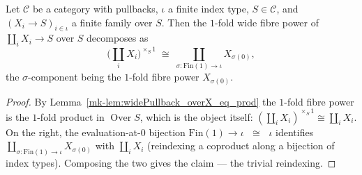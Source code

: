 \begin{lemma}\label{mk-lem:coproduct_distrib_fibrePower_zero}
  \leanok

  Let \(\mathcal{C}\) be a category with pullbacks, \(\iota\) a finite index type, \(S \in
  \mathcal{C}\), and \((X_i \to S)_{i \in \iota}\) a finite family over \(S\). Then the \(1\)-fold
  wide fibre power of \(\coprod_i X_i \to S\) over \(S\) decomposes as
  \[
    \bigl(\textstyle\coprod_{i} X_i\bigr)^{\times_S 1}
      \;\cong\;
    \coprod_{\sigma : \mathrm{Fin}(1) \to \iota} X_{\sigma(0)},
  \]
  the \(\sigma\)-component being the \(1\)-fold fibre power \(X_{\sigma(0)}\).
\end{lemma}
\begin{proof}
  By Lemma~\ref{mk-lem:widePullback_overX_eq_prod} the \(1\)-fold fibre power is the \(1\)-fold product
  in \(\operatorname{Over} S\), which is the object itself: \((\coprod_i X_i)^{\times_S 1} \cong
  \coprod_i X_i\). On the right, the evaluation-at-\(0\) bijection \(\mathrm{Fin}(1) \to \iota\)
  \(\;\cong\;\) \(\iota\) identifies \(\coprod_{\sigma : \mathrm{Fin}(1)\to\iota} X_{\sigma(0)}\)
  with \(\coprod_i X_i\) (reindexing a coproduct along a bijection of index types). Composing the
  two gives the claim --- the trivial reindexing.
\end{proof}

